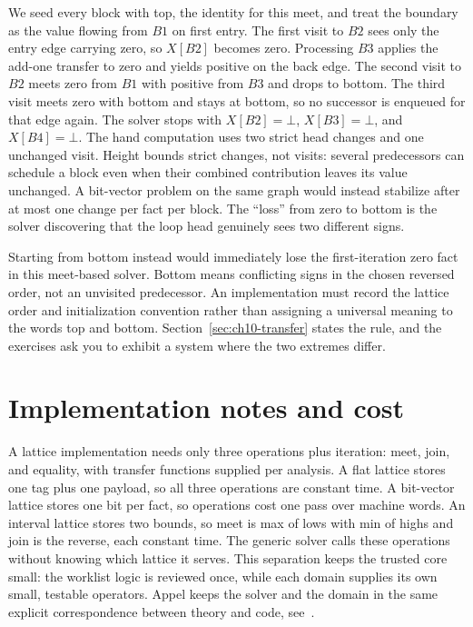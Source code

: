 We seed every block with top, the identity for this meet, and treat the boundary as the value flowing from $B1$ on first entry.
The first visit to $B2$ sees only the entry edge carrying zero, so $X[B2]$ becomes zero.
Processing $B3$ applies the add-one transfer to zero and yields positive on the back edge.
The second visit to $B2$ meets zero from $B1$ with positive from $B3$ and drops to bottom.
The third visit meets zero with bottom and stays at bottom, so no successor is enqueued for that edge again.
The solver stops with $X[B2] = \bot$, $X[B3] = \bot$, and $X[B4] = \bot$.
The hand computation uses two strict head changes and one unchanged visit.
Height bounds strict changes, not visits: several predecessors can schedule a block even when their combined contribution leaves its value unchanged.
A bit-vector problem on the same graph would instead stabilize after at most one change per fact per block.
The \enquote{loss} from zero to bottom is the solver discovering that the loop head genuinely sees two different signs.

Starting from bottom instead would immediately lose the first-iteration zero fact in this meet-based solver.
Bottom means conflicting signs in the chosen reversed order, not an unvisited predecessor.
An implementation must record the lattice order and initialization convention rather than assigning a universal meaning to the words top and bottom.
Section~\ref{sec:ch10-transfer} states the rule, and the exercises ask you to exhibit a system where the two extremes differ.

\section{Implementation notes and cost}
\label{sec:ch10-implementation}

A lattice implementation needs only three operations plus iteration: meet, join, and equality, with transfer functions supplied per analysis.
A flat lattice stores one tag plus one payload, so all three operations are constant time.
A bit-vector lattice stores one bit per fact, so operations cost one pass over machine words.
An interval lattice stores two bounds, so meet is max of lows with min of highs and join is the reverse, each constant time.
The generic solver calls these operations without knowing which lattice it serves.
This separation keeps the trusted core small: the worklist logic is reviewed once, while each domain supplies its own small, testable operators.
Appel keeps the solver and the domain in the same explicit correspondence between theory and code, see~\cite{appel-1998-modern}.


